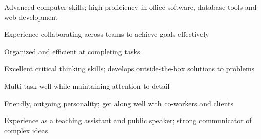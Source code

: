 

\begin{cvparagraph}

\vspace{4.0mm}
\begin{cvitems}
		\item
		{Advanced computer skills; high proficiency in office software, database tools and web development}
		\item
		{Experience collaborating across teams to achieve goals effectively}
		\item
		{Organized and efficient at completing tasks}
		\item
		{Excellent critical thinking skills; develops outside-the-box solutions to problems}
		\item
		{Multi-task well while maintaining attention to detail}
		\item
		{Friendly, outgoing personality; get along well with co-workers and clients}
		\item
		{Experience as a teaching assistant and public speaker; strong communicator of complex ideas}
	\end{cvitems}
\end{cvparagraph}
